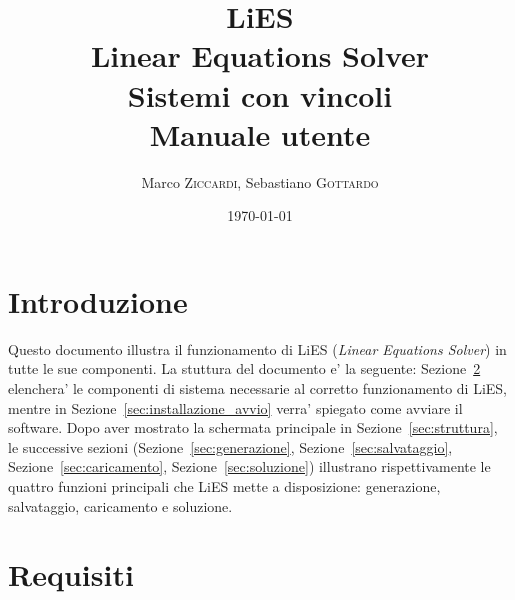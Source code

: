 \documentclass{article}
\title{LiES \\ Linear Equations Solver \\ Sistemi con vincoli \\\vspace{10mm} \textbf{Manuale utente}\vspace{10mm}} %
\author{Marco \textsc{Ziccardi}, Sebastiano \textsc{Gottardo}} %
\date{\today} %
\begin{document}
\maketitle %



\newpage
\tableofcontents
\newpage


\section{Introduzione}
\label{sec:introduzione}

Questo documento illustra il funzionamento di LiES (\textit{Linear Equations Solver}) in tutte le sue componenti. La stuttura del documento e' la seguente: Sezione~\ref{sec:requisiti} elenchera' le componenti di sistema necessarie al corretto funzionamento di LiES, mentre in Sezione~\ref{sec:installazione_avvio} verra' spiegato come avviare il software. Dopo aver mostrato la schermata principale in Sezione~\ref{sec:struttura}, le successive sezioni (Sezione~\ref{sec:generazione}, Sezione~\ref{sec:salvataggio}, Sezione~\ref{sec:caricamento}, Sezione~\ref{sec:soluzione}) illustrano rispettivamente le quattro funzioni principali che LiES mette a disposizione: generazione, salvataggio, caricamento e soluzione.


\section{Requisiti}
\label{sec:requisiti}
\end{document}
